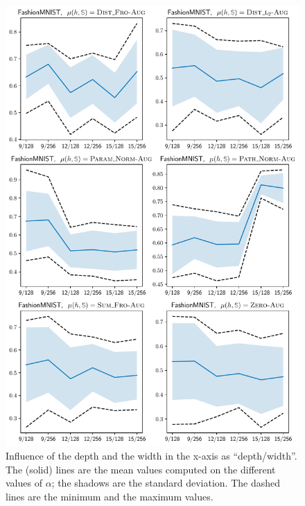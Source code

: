 \begin{noaddcontents}
\begin{figure}
    \centering
    \includegraphics[width=0.77\linewidth]{chapter_7/figures/influence_depth_fashion_aug.pdf}
    \caption{
    Influence of the depth and the width in the x-axis as ``depth/width''.
    The (solid) lines are the mean values computed on the different values of $\alpha$; the shadows are the standard deviation. 
    The dashed lines are the minimum and the maximum values.
    }
    \label{ap:dis-mu:fig:influence-depth-4}
\end{figure}
\end{noaddcontents}